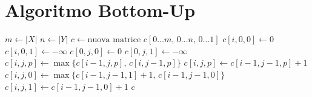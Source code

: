 \section{Algoritmo Bottom-Up}
\begin{algorithm}[htbp]
\caption{Calcolo Bottom-Up per LCS con un numero pari di simboli rossi}
\begin{algorithmic}[1]
    \State $m \gets |X|$
    \State $n \gets |Y|$
    \State $c \gets \text{nuova matrice } c[0 \dots m, \, 0 \dots n, \, 0 \dots 1]$
        \State $c[i, 0, 0] \gets 0$
        \State $c[i, 0, 1] \gets -\infty$
    \EndFor
        \State $c[0, j, 0] \gets 0$
        \State $c[0, j, 1] \gets -\infty$
    \EndFor
                    \State $c[i, j, p] \gets \max \{ c[i-1, j, p], \, c[i, j-1, p] \}$
                \Else
                        \State $c[i, j, p] \gets c[i-1, j-1, p] + 1$
                    \Else
                            \State $c[i, j, 0] \gets \max \{ c[i-1, j-1, 1] + 1, \, c[i-1, j-1, 0] \}$
                        \Else
                            \State $c[i, j, 1] \gets c[i-1, j-1, 0] + 1$
                        \EndIf
                    \EndIf
                \EndIf
            \EndFor
        \EndFor
    \EndFor
    \State \Return $c$
\EndProcedure
\end{algorithmic}
\end{algorithm}

